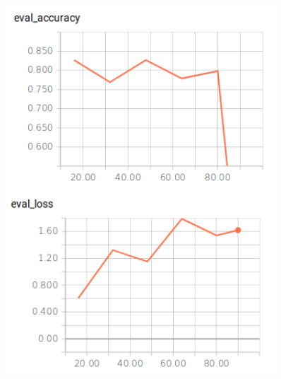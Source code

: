 \begin{figure}
\begin{minipage}{0.30\textwidth}
        \includegraphics[width=0.9\textwidth]{figures/tensorboard_askubuntu_large.png}
        \caption*{}
    \end{minipage}
    \hspace*{3mm}
    \begin{minipage}{0.30\textwidth}

\end{minipage}
\end{figure}
